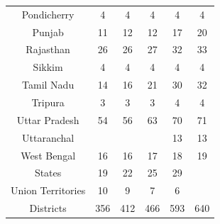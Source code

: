 \documentclass[12pt, a4paper]{article}
\begin{document}
\begin{table}[h!]
{\begin{tabular}{c|ccccc}
			Pondicherry & 4 & 4 & 4 & 4 & 4 \\ 
			Punjab & 11 & 12 & 12 & 17 & 20 \\ 
			Rajasthan & 26 & 26 & 27 & 32 & 33 \\ 
			Sikkim & 4 & 4 & 4 & 4 & 4 \\ 
			Tamil Nadu & 14 & 16 & 21 & 30 & 32 \\ 
			Tripura & 3 & 3 & 3 & 4 & 4 \\ 
			Uttar Pradesh & 54 & 56 & 63 & 70 & 71 \\ 
			Uttaranchal &  &  &  & 13 & 13 \\ 
			West Bengal & 16 & 16 & 17 & 18 & 19 \\ 
			\hline
			States & 19 & 22 & 25 & 29 &  \\ 
			Union Territories & 10 & 9 & 7 & 6 &  \\ 
			Districts & 356 & 412 & 466 & 593 & 640 \\ 
			\hline
		\end{tabular}}
	\end{table}
	
\end{document}

